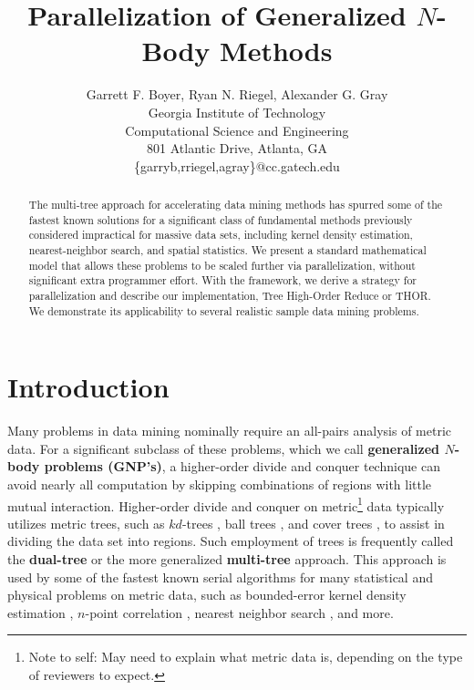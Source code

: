 \documentclass[twoside,leqno,twocolumn]{article}
\newcommand{\authornote}[1]{\footnote{Note to self: #1}}
\newcommand{\authorsnote}[1]{\authornote{#1}}
\newcommand{\defterm}[1]{{\bf #1}}
\begin{document}
\title{Parallelization of Generalized $N$-Body Methods}

\author{Garrett F. Boyer, Ryan N. Riegel, Alexander G. Gray
\\ Georgia Institute of Technology
\\ Computational Science and Engineering
\\ 801 Atlantic Drive, Atlanta, GA
\\ \{garryb,rriegel,agray\}@cc.gatech.edu
\\
}

\maketitle
\thispagestyle{empty}

\begin{abstract}
The multi-tree approach for accelerating data mining methods has spurred some of the fastest known solutions for a significant class of fundamental methods previously considered impractical for massive data sets, including kernel density estimation, nearest-neighbor search, and spatial statistics.
We present a standard mathematical model that allows these problems to be scaled further via parallelization, without significant extra programmer effort.
With the framework, we derive a strategy for parallelization and describe our implementation, Tree High-Order Reduce or THOR.
We demonstrate its applicability to several realistic sample data mining problems.
\end{abstract}

\section{Introduction}

Many problems in data mining nominally require an all-pairs analysis of metric data.
For a significant subclass of these problems, which we call \defterm{generalized $N$-body problems (GNP's)}, a higher-order divide and conquer technique can avoid nearly all computation by skipping combinations of regions with little mutual interaction.
Higher-order divide and conquer on metric\authorsnote{May need to explain what metric data is, depending on the type of reviewers to expect.} data typically utilizes metric trees, such as $kd$-trees \cite{preparata_kdtrees}, ball trees \cite{balltrees}, and cover trees \cite{covertrees}, to assist in dividing the data set into regions.
Such employment of trees is frequently called the \defterm{dual-tree} or the more generalized \defterm{multi-tree} approach.
This approach is used by some of the fastest known serial algorithms for many statistical and physical problems on metric data, such as bounded-error kernel density estimation \cite{gray_kde, lee_gauss1, lee_gauss2}, $n$-point correlation \cite{gray_nbody}, nearest neighbor search \cite{ryan_nips}, and more.
\end{document}
